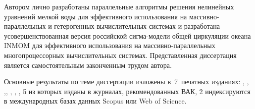{\contribution} Автором лично разработаны параллельные алгоритмы решения нелинейных уравнений мелкой воды для эффективного использования на массивно-параллельных и гетерогенных вычислительных системах и разработана усовершенствованная версия российской сигма-модели общей циркуляции океана INMOM для эффективного использования на массивно-параллельных многопроцессорных вычислительных системах. Представленная диссертация является самостоятельным законченным трудом автора. 

{\publications}
Основные результаты по теме диссертации изложены
в~7~печатных изданиях: \cite{ChaplyginINMOM2017}, \cite{ChaplyginSW2017}, \cite{ChaplyginAzov2017},\cite{DianskyInertOsc2019}, \cite{ChaplyginLB2019}, \cite{ChaplyginSW2021}, \cite{Chaplygin_Gusev_Diansky_2022}, 
5 из которых изданы в журналах, рекомендованных ВАК, 2 индексируются в международных базах данных Scopus или Web of Science.
